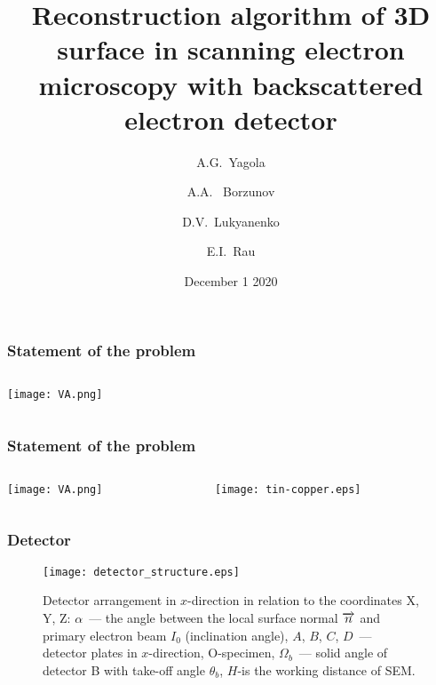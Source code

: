 \documentclass{beamer}
\title[3D surface reconstruction in SEM BE]{Reconstruction algorithm of 3D
    surface in scanning electron microscopy with backscattered electron
    detector}
\author[A.G.~Yagola]{A.G.~Yagola \inst{1} \and A.A.~ Borzunov \inst{1}
    \and D.V.~Lukyanenko \inst{1} \and E.I.~Rau \inst{1}}
\institute[Lomonosov MSU]{\inst{1}Lomonosov Moscow State University}
\date{December 1 2020}
\begin{document}
\begin{frame}[c]
    \titlepage
\end{frame}

\begin{frame}[c]
    \frametitle{Statement of the problem}
    \begin{columns}
        \begin{column}{0.5\textwidth}
            \texttt{[image: VA.png]}
        \end{column}
        \begin{column}{0.5\textwidth}
        \end{column}
    \end{columns}
\end{frame}

\begin{frame}[c]
    \frametitle{Statement of the problem}
    \begin{columns}
        \begin{column}{0.38\textwidth}
            \texttt{[image: VA.png]}
        \end{column}
        \begin{column}{0.58\textwidth}
            \texttt{[image: tin-copper.eps]}
        \end{column}
    \end{columns}
\end{frame}

\begin{frame}[c]
    \frametitle{Detector}
    \begin{figure}
        \texttt{[image: detector\_structure.eps]}
        \caption{Detector arrangement in $x$-direction in relation to the coordinates X, Y, Z:
        \@ $\alpha$~--- the angle between the local surface normal $\protect\overrightarrow{n}$
        and primary electron beam $I_0$ (inclination angle), $A$, $B$, $C$, $D$~--- detector
        plates in $x$-direction, O-specimen, $\Omega_{b}$~--- solid angle of detector B with
        take-off angle $\theta_b$, $H$-is the working distance of SEM.}
        {\label{fig:detector_structure}}%
    \end{figure}
\end{frame}
\end{document}
